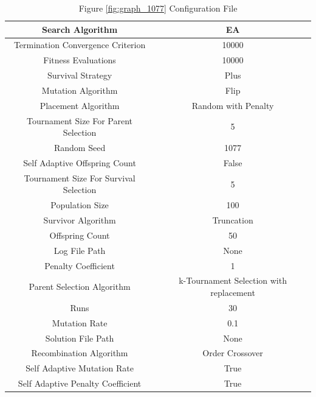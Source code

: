\documentclass{standalone}
\begin{document}
\begin{table}[!htb]
	\centering
	\caption{Figure \ref{fig:graph_1077} Configuration File}
	\label{tab:graph_1077}
	\begin{tabular}{| c | c |}
		\hline
		Search Algorithm		& EA		 \\
		\hline
		Termination Convergence Criterion		& 10000		 \\
		\hline
		Fitness Evaluations		& 10000		 \\
		\hline
		Survival Strategy		& Plus		 \\
		\hline
		Mutation Algorithm		& Flip		 \\
		\hline
		Placement Algorithm		& Random with Penalty		 \\
		\hline
		Tournament Size For Parent Selection		& 5		 \\
		\hline
		Random Seed		& 1077		 \\
		\hline
		Self Adaptive Offspring Count		& False		 \\
		\hline
		Tournament Size For Survival Selection		& 5		 \\
		\hline
		Population Size		& 100		 \\
		\hline
		Survivor Algorithm		& Truncation		 \\
		\hline
		Offspring Count		& 50		 \\
		\hline
		Log File Path		& None		 \\
		\hline
		Penalty Coefficient		& 1		 \\
		\hline
		Parent Selection Algorithm		& k-Tournament Selection with replacement		 \\
		\hline
		Runs		& 30		 \\
		\hline
		Mutation Rate		& 0.1		 \\
		\hline
		Solution File Path		& None		 \\
		\hline
		Recombination Algorithm		& Order Crossover		 \\
		\hline
		Self Adaptive Mutation Rate		& True		 \\
		\hline
		Self Adaptive Penalty Coefficient		& True		 \\
		\hline
	\end{tabular}
\end{table}
\end{document}
